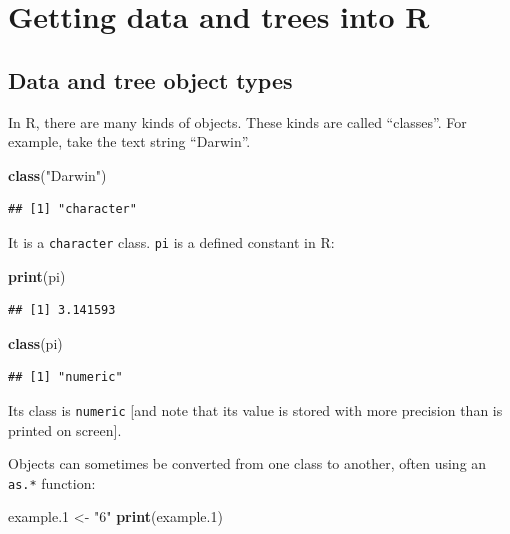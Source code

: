 \documentclass[]{book}
\newenvironment{Shaded}{\begin{snugshade}}{\end{snugshade}}
\newcommand{\KeywordTok}[1]{\textcolor[rgb]{0.13,0.29,0.53}{\textbf{{#1}}}}
\newcommand{\FloatTok}[1]{\textcolor[rgb]{0.00,0.00,0.81}{{#1}}}
\newcommand{\StringTok}[1]{\textcolor[rgb]{0.31,0.60,0.02}{{#1}}}
\newcommand{\NormalTok}[1]{{#1}}
\theoremstyle{definition}
\theoremstyle{definition}
\theoremstyle{remark}
\begin{document}
\chapter{Getting data and trees into
R}\label{getting-data-and-trees-into-r}

\section{Data and tree object types}\label{data-and-tree-object-types}

In R, there are many kinds of objects. These kinds are called
``classes''. For example, take the text string ``Darwin''.

\begin{Shaded}
\begin{Highlighting}[]
\KeywordTok{class}\NormalTok{(}\StringTok{"Darwin"}\NormalTok{)}
\end{Highlighting}
\end{Shaded}

\begin{verbatim}
## [1] "character"
\end{verbatim}

It is a \texttt{character} class. \texttt{pi} is a defined constant in
R:

\begin{Shaded}
\begin{Highlighting}[]
\KeywordTok{print}\NormalTok{(pi)}
\end{Highlighting}
\end{Shaded}

\begin{verbatim}
## [1] 3.141593
\end{verbatim}

\begin{Shaded}
\begin{Highlighting}[]
\KeywordTok{class}\NormalTok{(pi)}
\end{Highlighting}
\end{Shaded}

\begin{verbatim}
## [1] "numeric"
\end{verbatim}

Its class is \texttt{numeric} {[}and note that its value is stored with
more precision than is printed on screen{]}.

Objects can sometimes be converted from one class to another, often
using an \texttt{as.*} function:

\begin{Shaded}
\begin{Highlighting}[]
\NormalTok{example}\FloatTok{.1} \NormalTok{<-}\StringTok{ "6"}
\KeywordTok{print}\NormalTok{(example}\FloatTok{.1}\NormalTok{)}
\end{Highlighting}
\end{Shaded}
\end{document}
